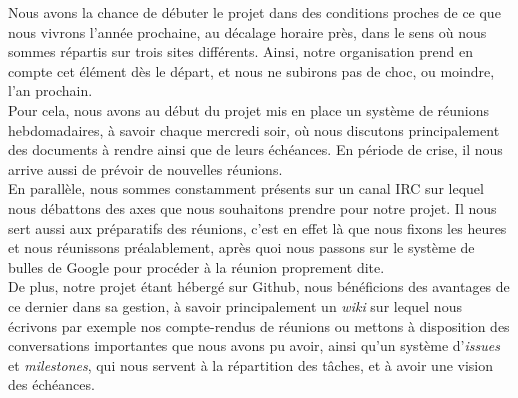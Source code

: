 Nous avons la chance de débuter le projet dans des conditions proches de ce que nous vivrons l'année prochaine, au décalage horaire près, dans le sens où nous sommes répartis sur trois sites différents. Ainsi, notre organisation prend en compte cet élément dès le départ, et nous ne subirons pas de choc, ou moindre, l'an prochain.\\

Pour cela, nous avons au début du projet mis en place un système de réunions hebdomadaires, à savoir chaque mercredi soir, où nous discutons principalement des documents à rendre ainsi que de leurs échéances. En période de crise, il nous arrive aussi de prévoir de nouvelles réunions.\\

En parallèle, nous sommes constamment présents sur un canal IRC sur lequel nous débattons des axes que nous souhaitons prendre pour notre projet. Il nous sert aussi aux préparatifs des réunions, c'est en effet là que nous fixons les heures et nous réunissons préalablement, après quoi nous passons sur le système de bulles de Google pour procéder à la réunion proprement dite.\\

De plus, notre projet étant hébergé sur Github, nous bénéficions des avantages de ce dernier dans sa gestion, à savoir principalement un \textit{wiki} sur lequel nous écrivons par exemple nos compte-rendus de réunions ou mettons à disposition des conversations importantes que nous avons pu avoir, ainsi qu'un système d'\textit{issues} et \textit{milestones}, qui nous servent à la répartition des tâches, et à avoir une vision des échéances.